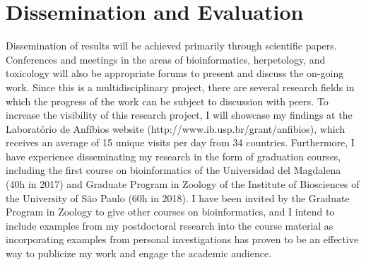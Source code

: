 \section{Dissemination and Evaluation}

Dissemination of results will be achieved primarily through scientific papers. Conferences and meetings in the areas of bioinformatics, herpetology, and toxicology will also be appropriate forums to present and discuss the on-going work. Since this is a multidisciplinary project, there are several research fields in which the progress of the work can be subject to discussion with peers. To increase the visibility of this research project, I will showcase my findings at the Laboratório de Anfíbios website (http://www.ib.usp.br/grant/anfibios), which receives an average of 15 unique visits per day from 34 countries. Furthermore, I have experience disseminating my research in the form of graduation courses, including the first course on bioinformatics of the Universidad del Magdalena (40h in 2017) and Graduate Program in Zoology of the Institute of Biosciences of the University of São Paulo (60h in 2018). I have been invited by the Graduate Program in Zoology to give other courses on bioinformatics, and I intend to include examples from my postdoctoral research into the course material as incorporating examples from personal investigations has proven to be an effective way to publicize my work and engage the academic audience.